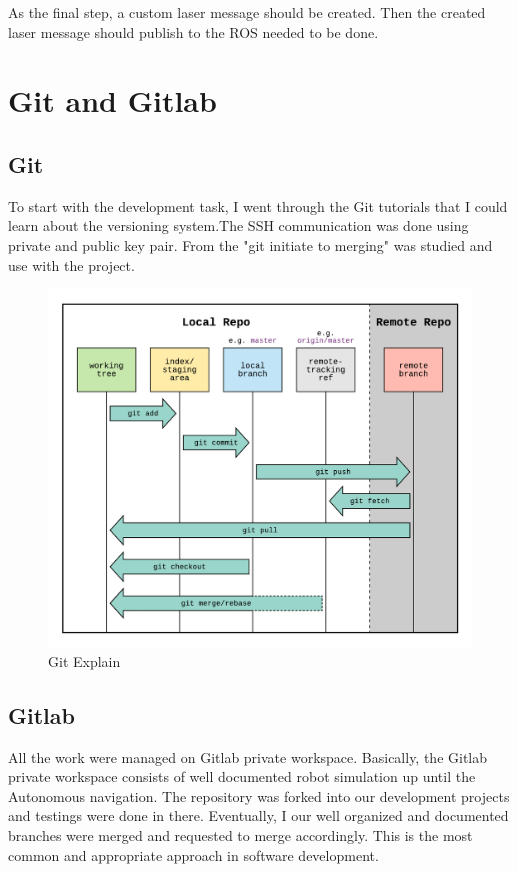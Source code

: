 \documentclass[twoside,12pt,times,onecolumn,a4paper]{report}
\begin{document}
As the final step, a custom laser message should be created. Then the created laser 
message should publish to the ROS needed to be done.

\section{ Git and Gitlab}

\subsection{Git}
To start with the development task, I went through the Git tutorials that I could learn about the versioning system.The SSH communication was done using private and public key pair.  From the "git initiate to merging" was studied and use with the project. 

\begin{figure}[H]
  \centering
   \includegraphics[width=15cm]{git}
  \caption{Git Explain}
\end{figure}


\subsection{Gitlab}
All the work were managed on Gitlab private workspace. Basically, the Gitlab private workspace consists of well documented robot simulation up until the Autonomous navigation. The repository was forked into our development projects and testings were done in there. Eventually, I our well organized and documented branches were merged and requested to merge accordingly. This is the most common and appropriate approach in software development. 
\end{document}
